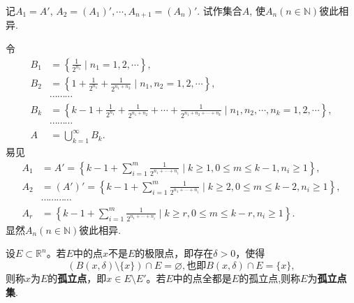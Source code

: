 \documentclass[../../main.tex]{subfiles}%
\begin{document}
\begin{example}
记$A_1 = A'$, $A_2 = (A_1)', \cdots, A_{n+1} = (A_n)'.$ 试作集合$A$, 使$A_n(n \in \mathbb{N})$彼此相异.
\end{example}
\begin{solution}

令
\begin{align*}
B_1 &= \left\{ \frac{1}{2^{n_1}} \mid n_1 = 1,2,\cdots \right\}, \\
B_2 &= \left\{ 1 + \frac{1}{2^{n_1}} + \frac{1}{2^{n_1 + n_2}} \mid n_1, n_2 = 1,2,\cdots \right\}, \\
&\cdots\cdots\cdots \\
B_k &= \left\{ k-1 + \frac{1}{2^{n_1}} + \frac{1}{2^{n_1 + n_2}} + \cdots + \frac{1}{2^{n_1 + n_2 + \cdots + n_k}} \mid n_1, n_2, \cdots, n_k = 1,2,\cdots \right\}, \\
&\cdots\cdots\cdots \\
A &= \bigcup_{k=1}^\infty B_k.
\end{align*}
易见
\begin{align*}
A_1&=A' =\left\{ k-1+\sum_{i=1}^m{\frac{1}{2^{n_1+\cdots +n_i}}}\mid k\geqslant 1,0\leqslant m\leqslant k-1,n_i\geqslant 1 \right\} ,
\\
A_2&=\left( A' \right)' =\left\{ k-1+\sum_{i=1}^m{\frac{1}{2^{n_1+\cdots +n_i}}}\mid k\geqslant 2,0\leqslant m\leqslant k-2,n_i\geqslant 1 \right\} ,
\\
&\cdots \cdots \cdots \cdots 
\\
A_r&=\left\{ k-1+\sum_{i=1}^m{\frac{1}{2^{n_1+\cdots +n_i}}}\mid k\geqslant r,0\leqslant m\leqslant k-r,n_i\geqslant 1 \right\} .
\end{align*}
显然$A_n(n \in \mathbb{N})$彼此相异.

\end{solution}

\begin{definition}[孤立点]\label{definition:孤立点}
设\(E\subset\mathbb{R}^n\)。若\(E\)中的点\(x\)不是\(E\)的极限点，即存在\(\delta>0\)，使得
\[(B(x,\delta)\setminus\{x\})\cap E=\varnothing,\text{也即}B(x,\delta)\cap E=\{x\},
\]
则称\(x\)为\(E\)的\textbf{孤立点}，即\(x\in E\setminus E'\)。若$E$中的点全都是$E$的孤立点,则称$E$为\textbf{孤立点集}.
\end{definition}
\end{document}
